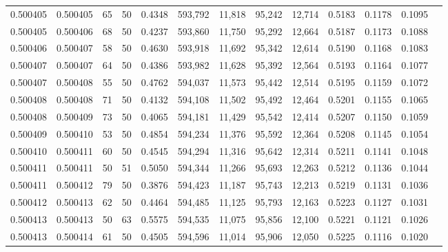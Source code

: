 \begin{tabular}{rrrrrrrrrrrrr}
0.500405 & 0.500405 &    65 &  50 &                                     0.4348 & 593,792 &  11,818 &  95,242 &  12,714 & 0.5183 & 0.1178 & 0.1095 \\
0.500405 & 0.500406 &    68 &  50 &                                     0.4237 & 593,860 &  11,750 &  95,292 &  12,664 & 0.5187 & 0.1173 & 0.1088 \\
0.500406 & 0.500407 &    58 &  50 &                                     0.4630 & 593,918 &  11,692 &  95,342 &  12,614 & 0.5190 & 0.1168 & 0.1083 \\
0.500407 & 0.500407 &    64 &  50 &                                     0.4386 & 593,982 &  11,628 &  95,392 &  12,564 & 0.5193 & 0.1164 & 0.1077 \\
0.500407 & 0.500408 &    55 &  50 &                                     0.4762 & 594,037 &  11,573 &  95,442 &  12,514 & 0.5195 & 0.1159 & 0.1072 \\
0.500408 & 0.500408 &    71 &  50 &                                     0.4132 & 594,108 &  11,502 &  95,492 &  12,464 & 0.5201 & 0.1155 & 0.1065 \\
0.500408 & 0.500409 &    73 &  50 &                                     0.4065 & 594,181 &  11,429 &  95,542 &  12,414 & 0.5207 & 0.1150 & 0.1059 \\
0.500409 & 0.500410 &    53 &  50 &                                     0.4854 & 594,234 &  11,376 &  95,592 &  12,364 & 0.5208 & 0.1145 & 0.1054 \\
0.500410 & 0.500411 &    60 &  50 &                                     0.4545 & 594,294 &  11,316 &  95,642 &  12,314 & 0.5211 & 0.1141 & 0.1048 \\
0.500411 & 0.500411 &    50 &  51 &                                     0.5050 & 594,344 &  11,266 &  95,693 &  12,263 & 0.5212 & 0.1136 & 0.1044 \\
0.500411 & 0.500412 &    79 &  50 &                                     0.3876 & 594,423 &  11,187 &  95,743 &  12,213 & 0.5219 & 0.1131 & 0.1036 \\
0.500412 & 0.500413 &    62 &  50 &                                     0.4464 & 594,485 &  11,125 &  95,793 &  12,163 & 0.5223 & 0.1127 & 0.1031 \\
0.500413 & 0.500413 &    50 &  63 &                                     0.5575 & 594,535 &  11,075 &  95,856 &  12,100 & 0.5221 & 0.1121 & 0.1026 \\
0.500413 & 0.500414 &    61 &  50 &                                     0.4505 & 594,596 &  11,014 &  95,906 &  12,050 & 0.5225 & 0.1116 & 0.1020 \\

\end{tabular}
